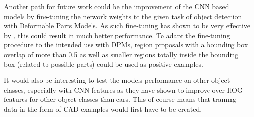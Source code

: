 Another path for future work could be the improvement of the CNN based models by fine-tuning the network weights to the given task of object detection with Deformable Parts Models. As such fine-tuning has shown to be very effective by \cite{girshick2013rich}, this could result in much better performance. To adapt the fine-tuning procedure to the intended use with DPMs, region proposals with a bounding box overlap of more than 0.5 as well as smaller regions totally inside the bounding box (related to possible parts) could be used as positive examples. 

It would also be interesting to test the models performance on other object classes, especially with CNN features as they have shown to improve over HOG features for other object classes than cars. This of course means that training data in the form of CAD examples would first have to be created. 